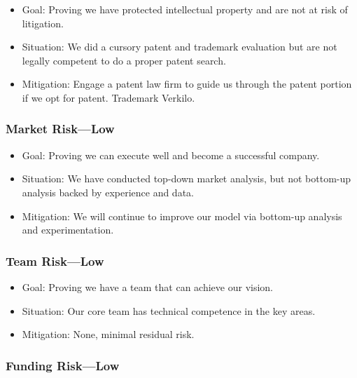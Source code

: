 \documentclass[10pt,openany]{book}
\providecommand{\tightlist}{%
  \setlength{\itemsep}{0pt}\setlength{\parskip}{0pt}}
\begin{document}
\begin{itemize}
\tightlist
\item
  Goal: Proving we have protected intellectual property and are not at
  risk of litigation.
\item
  Situation: We did a cursory patent and trademark evaluation but are
  not legally competent to do a proper patent search.
\item
  Mitigation: Engage a patent law firm to guide us through the patent
  portion if we opt for patent. Trademark Verkilo.
\end{itemize}

\hypertarget{market-risklow}{%
\subsubsection{Market Risk---Low}\label{market-risklow}}

\begin{itemize}
\tightlist
\item
  Goal: Proving we can execute well and become a successful company.
\item
  Situation: We have conducted top-down market analysis, but not
  bottom-up analysis backed by experience and data.
\item
  Mitigation: We will continue to improve our model via bottom-up
  analysis and experimentation.
\end{itemize}

\newpage

\hypertarget{team-risklow}{%
\subsubsection{Team Risk---Low}\label{team-risklow}}

\begin{itemize}
\tightlist
\item
  Goal: Proving we have a team that can achieve our vision.
\item
  Situation: Our core team has technical competence in the key areas.
\item
  Mitigation: None, minimal residual risk.
\end{itemize}

\hypertarget{funding-risklow}{%
\subsubsection{Funding Risk---Low}\label{funding-risklow}}
\end{document}
